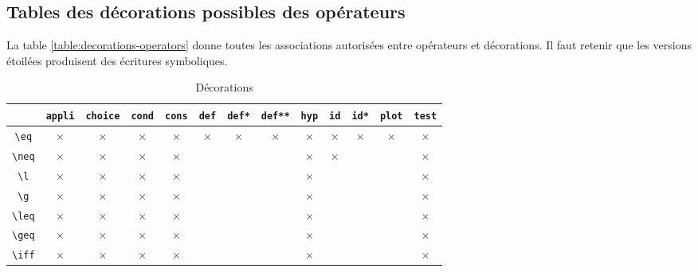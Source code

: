 \documentclass[12pt,a4paper]{article}
\begin{document}

\subsection{Tables des décorations possibles des opérateurs}

La table \ref{table:decorations-operators}  donne toutes les associations autorisées entre opérateurs et décorations.
Il faut retenir que les versions étoilées produisent des écritures symboliques. 



\begin{table}[h]
    \caption{Décorations}
    \begin{center}
        \begin{tabular}{c|c|c|c|c|c|c|c|c|c|c|c|c}
              & \verb+appli+ & \verb+choice+ & \verb+cond+ & \verb+cons+ & \verb+def+ & \verb+def*+ & \verb+def**+ & \verb+hyp+ & \verb+id+ & \verb+id*+ & \verb+plot+ & \verb+test+ \\
            \hline \verb+\eq+ & $\times$ & $\times$ & $\times$ & $\times$ & $\times$ & $\times$ & $\times$ & $\times$ & $\times$ & $\times$ & $\times$ & $\times$ \\
            \hline \verb+\neq+ & $\times$ & $\times$ & $\times$ & $\times$ &          &          &          & $\times$ & $\times$ &          &          & $\times$ \\
            \hline \verb+\l+ & $\times$ & $\times$ & $\times$ & $\times$ &          &          &          & $\times$ &          &          &          & $\times$ \\
            \hline \verb+\g+ & $\times$ & $\times$ & $\times$ & $\times$ &          &          &          & $\times$ &          &          &          & $\times$ \\
            \hline \verb+\leq+ & $\times$ & $\times$ & $\times$ & $\times$ &          &          &          & $\times$ &          &          &          & $\times$ \\
            \hline \verb+\geq+ & $\times$ & $\times$ & $\times$ & $\times$ &          &          &          & $\times$ &          &          &          & $\times$ \\
            \hline \verb+\iff+ & $\times$ & $\times$ & $\times$ & $\times$ &          &          &          & $\times$ &          &          &          & $\times$ \\

\end{tabular}
\end{center}
\end{table}
\end{document}
